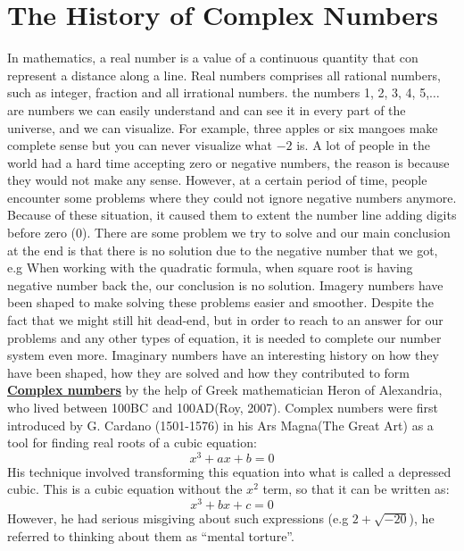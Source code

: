 \documentclass[12pt]{report}
\newcommand{\ubt}[1]{\textbf{\underline{#1}}}
\begin{document}
	\section{The History of Complex Numbers}
	In mathematics, a real number is a value of a continuous quantity that con represent a distance along a line. Real numbers comprises all rational numbers, such as integer, fraction and all irrational numbers. the numbers 1, 2, 3, 4, 5,$\ldots$ are numbers we can easily understand and can see it in every part of the universe, and we can visualize. For example, three apples or six mangoes make complete sense but you can never visualize what $-2$ is. A lot of people in the world had a hard time accepting zero or negative numbers, the reason is because they would not make any sense. However, at a certain period of time, people encounter some problems where they could not ignore negative numbers anymore. Because of these situation, it caused them to extent the number line adding digits before zero (0). There are some problem we try to solve and our main conclusion at the end is that there is no solution due to the negative number that we got, e.g When working with the quadratic formula, when square root is having negative number back the, our conclusion is no solution. Imagery numbers have been shaped to make solving these problems easier and smoother. Despite the fact that we might still hit dead-end, but in order to reach to an answer for our problems and any other types of equation, it is needed to complete our number system even more. Imaginary numbers have an interesting history on how they have been shaped, how they are solved and how they contributed to form \ubt{Complex numbers} by the help of Greek mathematician Heron of Alexandria, who lived between 100BC and 100AD(Roy, 2007). Complex numbers were first introduced by G. Cardano (1501-1576) in his Ars Magna(The Great Art) as a tool for finding real roots of a cubic equation:
	\begin{equation}
		x^3+ax+b=0\label{eq:1_1}
	\end{equation}
	His technique involved transforming this equation into what is called a depressed cubic. This is a cubic equation without the $x^2$ term, so that it can be written as:
	\begin{equation}
		x^3 +bx + c = 0\label{eq:1_2}
	\end{equation}
	However, he had serious misgiving about such expressions (e.g $2+\sqrt{-20}$), he referred to thinking about them as ``mental torture''.\\
	
\end{document}
